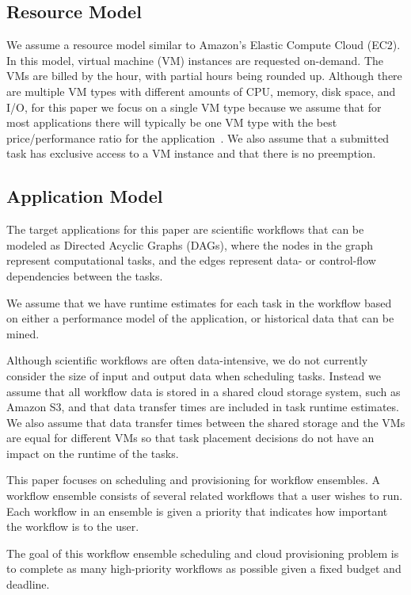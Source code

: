 \documentclass{sig-alternate}
\begin{document}
\subsection{Resource Model}

We assume a resource model similar to Amazon's Elastic Compute Cloud (EC2). In
this model, virtual machine (VM) instances are requested on-demand. The VMs are
billed by the hour, with partial hours being rounded up. Although there are
multiple VM types with different amounts of CPU, memory, disk space, and I/O,
for this paper we focus on a single VM type because we assume that for most
applications there will typically be one VM type with the best price/performance
ratio for the application~\cite{Juve2009}. We also assume that a submitted task
has exclusive access to a VM instance and that there is no preemption.


\subsection{Application Model}
The target applications for this paper are scientific workflows that can be
modeled as Directed Acyclic Graphs (DAGs), where the nodes in the graph
represent computational tasks, and the edges represent data- or control-flow
dependencies between the tasks.


We assume that we have runtime estimates for each task in the workflow based on
either a performance model of the application, or historical data that can be
mined.


Although scientific workflows are often data-intensive, we do not currently
consider the size of input and output data when scheduling tasks. Instead we
assume that all workflow data is stored in a shared cloud storage system, such
as Amazon S3, and that data transfer times are included in task runtime
estimates. We also assume that data transfer times between the shared storage
and the VMs are equal for different VMs so that task placement decisions do not
have an impact on the runtime of the tasks.


This paper focuses on scheduling and provisioning for workflow ensembles. A
workflow ensemble consists of several related workflows that a user wishes to
run. Each workflow in an ensemble is given a priority that indicates how
important the workflow is to the user.


The goal of this workflow ensemble scheduling and cloud provisioning problem is
to complete as many high-priority workflows as possible given a fixed budget and
deadline.
\end{document}
